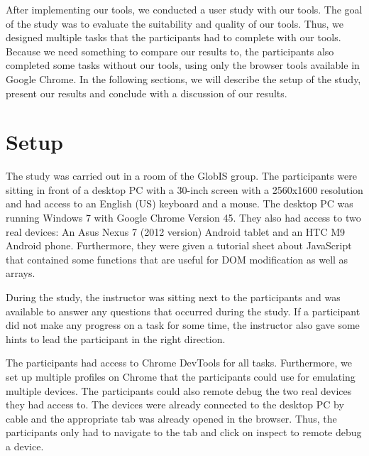 After implementing our tools, we conducted a user study with our tools. The goal of the study was to evaluate the suitability and quality of our tools. Thus, we designed multiple tasks that the participants had to complete with our tools. Because we need something to compare our results to, the participants also completed some tasks without our tools, using only the browser tools available in Google Chrome. In the following sections, we will describe the setup of the study, present our results and conclude with a discussion of our results.

\section{Setup}

The study was carried out in a room of the GlobIS group. The participants were sitting in front of a desktop PC with a 30-inch screen with a 2560x1600 resolution and had access to an English (US) keyboard and a mouse. The desktop PC was running Windows 7 with Google Chrome Version 45. They also had access to two real devices: An Asus Nexus 7 (2012 version) Android tablet and an HTC M9 Android phone. Furthermore, they were given a tutorial sheet about JavaScript that contained some functions that are useful for DOM modification as well as arrays. 

During the study, the instructor was sitting next to the participants and was available to answer any questions that occurred during the study. If a participant did not make any progress on a task for some time, the instructor also gave some hints to lead the participant in the right direction.

The participants had access to Chrome DevTools for all tasks. Furthermore, we set up multiple profiles on Chrome that the participants could use for emulating multiple devices. The participants could also remote debug the two real devices they had access to. The devices were already connected to the desktop PC by cable and the appropriate tab was already opened in the browser. Thus, the participants only had to navigate to the tab and click on inspect to remote debug a device. 

